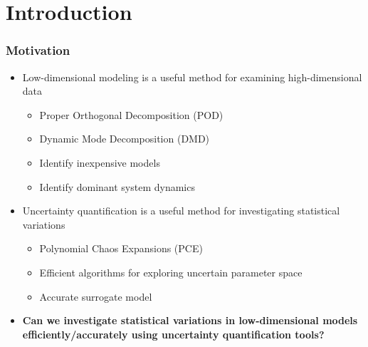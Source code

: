 \documentclass[9pt]{beamer}
\begin{document}
\section{Introduction}
\label{sec-1}
\begin{frame}
\frametitle{Motivation}
\label{sec-1-1}

\begin{itemize}
\item Low-dimensional modeling is a useful method for examining high-dimensional data
\begin{itemize}
\item Proper Orthogonal Decomposition (POD)
\item Dynamic Mode Decomposition (DMD)
\item Identify inexpensive models
\item Identify dominant system dynamics
\end{itemize}
\item Uncertainty quantification is a useful method for investigating statistical variations
\begin{itemize}
\item Polynomial Chaos Expansions (PCE)
\item Efficient algorithms for exploring uncertain parameter space
\item Accurate surrogate model
\end{itemize}
\item \textbf{Can we investigate statistical variations in low-dimensional models   efficiently/accurately using uncertainty quantification tools?}
\end{itemize}
\end{frame}
\end{document}
